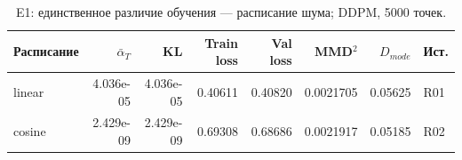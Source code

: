 \begin{table}[H]\centering\scriptsize
\setlength{\tabcolsep}{4pt}
\caption{E1: единственное различие обучения --- расписание шума; DDPM, 5000 точек.}\label{tab:e1}
\begin{tabular}{lrrrrrrl}
\toprule
Расписание & $\bar\alpha_T$ & KL & Train loss & Val loss & MMD$^2$ & $D_{mode}$ & Ист. \\
\midrule
linear & 4.036e-05 & 4.036e-05 & 0.40611 & 0.40820 & 0.0021705 & 0.05625 & R01 \\
cosine & 2.429e-09 & 2.429e-09 & 0.69308 & 0.68686 & 0.0021917 & 0.05185 & R02 \\
\bottomrule
\end{tabular}
\end{table}
